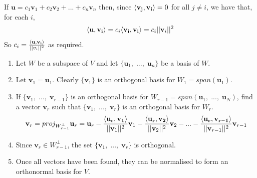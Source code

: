 {If \(\mathbf{u} = c_1\mathbf{v}_1 + c_2\mathbf{v}_2 + ... + c_n\mathbf{v}_n\) then, since \(\langle\mathbf{v_j},\mathbf{v_i}\rangle = 0\) for all \(j \neq i\), we have that, for each \(i\), 
\begin{equation}
    \langle\mathbf{u},\mathbf{v_i}\rangle = c_i\langle\mathbf{v_i},\mathbf{v_i}\rangle = c_i||\mathbf{v}_i||^2
\end{equation}
So \(c_i = \frac{\langle\mathbf{u},\mathbf{v_i}\rangle}{||v_i||^2}\) as required.}


\begin{enumerate}
    \item Let \(W\) be a subspace of \(V\) and let \(\{\mathbf{u}_1,\;...,\;\mathbf{u}_n\}\) be a basis of \(W\).
    \item Let \(\mathbf{v}_1 = \mathbf{u}_1\). Clearly \(\{\mathbf{v}_1\}\) is an orthogonal basis for \(W_1 = span(\mathbf{u}_1)\).
    \item If \(\{\mathbf{v}_1,\;...,\;\mathbf{v}_{r-1}\}\) is an orthogonal basis for \(W_{r-1} = span(\mathbf{u}_1,\;...,\;\mathbf{u}_N)\), find a vector \(\mathbf{v}_r\) such that \(\{\mathbf{v}_1,\;...,\;\mathbf{v}_{r}\}\) is an orthogonal basis for \(W_r\).
    \begin{equation}
        \mathbf{v}_r = proj_{W_{r-1}^\perp}\mathbf{u}_r = \mathbf{u}_r - \frac{\langle\mathbf{u_r},\mathbf{v_1}\rangle}{||\mathbf{v}_1||^2}\mathbf{v}_1 - \frac{\langle\mathbf{u_r},\mathbf{v_2}\rangle}{||\mathbf{v}_2||^2}\mathbf{v}_2 - ... - \frac{\langle\mathbf{u_r},\mathbf{v_{r-1}}\rangle}{||\mathbf{v}_{r-1}||^2}\mathbf{v}_{r-1}
    \end{equation}
    \item Since \(\mathbf{v}_r \in W^\perp_{r-1}\), the set \(\{\mathbf{v}_1,\;...,\;\mathbf{v}_{r}\}\) is orthogonal.
    \item Once all vectors have been found, they can be normalised to form an orthonormal basis for \(V\).
\end{enumerate}

